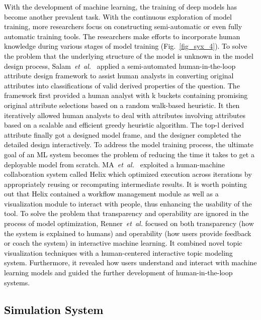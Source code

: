 \documentclass{article}
\newcommand\etal{\emph{et~al.}}
\newcommand{\p}[1]{\textcolor{black}{#1}}
\newcommand{\REO}[1]{\textcolor{black}{#1}}
\begin{document}
\REO{
With the development of machine learning, the training of deep models has become another \p{prevalent} task.
With the continuous exploration of model training, more researchers focus on constructing semi-automatic or even fully automatic training tools.
\p{The researchers make efforts to incorporate human knowledge during various stages of model training} (Fig.~\ref{fig_syx_4}).
To solve the problem that the underlying structure of the model is unknown in the model design process, Salam~\etal~\cite{salam2019human} \p{applied} a semi-automated \REO{human-in-the-loop} attribute design framework to \p{assist human analysts in converting} original attributes into classifications of valid derived properties of the question. The framework first provided a human analyst with k buckets containing promising original attribute selections based on a random walk-based heuristic. \p{It then iteratively allowed human analysts to deal with attributes involving attributes based on a scalable and efficient greedy heuristic algorithm.} The top-l derived attribute finally got a designed model frame, and the designer completed the detailed design interactively.
To address the model training process, the ultimate goal of an ML system becomes the problem of reducing the time it takes to get a deployable model from scratch.
MA~\etal~\cite{ma2018towards} \p{exploited} a human-machine collaboration system called Helix which optimized execution across iterations by appropriately reusing or recomputing intermediate results. It is worth pointing out that Helix \p{contained} a workflow management module as well as a visualization module to interact with people, thus enhancing the usability of the tool.
To solve the problem that transparency and operability are ignored in the process of model optimization,
Renner~\etal\cite{renner2020designing} focused on both transparency (how the system is explained to humans) and operability (how users provide feedback or coach the system) in interactive machine learning. It combined novel topic visualization techniques with a human-centered interactive topic modeling system. \p{Furthermore}, it revealed how users understand and interact with machine learning models and guided the further development of \REO{human-in-the-loop} systems.
}




\REO{\subsection{Simulation System}}
\end{document}
